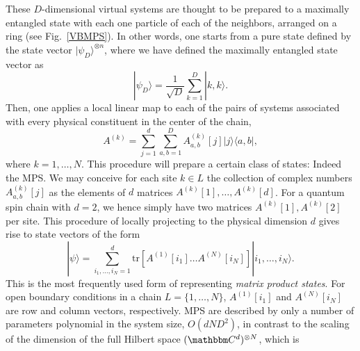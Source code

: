 \documentclass[12pt, rmp,floatfix,epsfig,graphics]{revtex4} %
\begin{document}
These $D$-dimensional virtual systems are thought to be prepared to 
a maximally entangled state with each one particle of each of the 
neighbors, arranged on a ring (see Fig.\ \ref{VBMPS}). In other words, 
one starts from a 
pure state defined by the state vector $|\psi_D\rangle ^{\otimes n}$, 
where we have defined the maximally entangled state vector as 
\begin{equation}\label{maxent}
        |\psi_D\rangle= \frac{1}{\sqrt{D}}\sum_{k=1}^D |k,k\rangle.
\end{equation}  
Then, one applies a local linear map to each of the pairs of 
systems associated with every physical constituent in the center 
of the chain,
\begin{equation}\label{project}
        A^{(k)}= \sum_{j=1}^d \sum_{a,b=1}^D A^{(k)}_{a,b}[j]
        |j\rangle\langle a,b|,
\end{equation}
where $k=1,\dots, N$. This procedure will prepare a certain 
class of states: Indeed the MPS. We may conceive
for each site $k\in L$ the collection of complex
numbers $A^{(k)}_{a,b}[j]$ as the elements of $d$ matrices
$A^{(k)}[1],\dots, A^{(k)}[d]$. For a quantum spin chain with
$d=2$, we hence simply  have two matrices $A^{(k)}[1],A^{(k)}[2]$ per site.
%
This procedure of locally projecting to the physical dimension $d$
gives rise to state vectors of the form
\begin{equation}\label{MPS}
        |\psi\rangle = \sum_{i_1,\dots, i_N=1}^d
        \text{tr}[A^{(1)}[i_1]\dots A^{(N)}[i_N] ]
        |i_1,\dots, i_N\rangle.
\end{equation}
This is the most frequently used form of representing
{\it matrix product states}. For open boundary conditions 
in a chain $L= \{1,\dots, N\}$, $ A^{(1)}[i_1]$ and $A^{(N)}[i_N] $ 
are row and column vectors, respectively. MPS are described 
by only a number of parameters polynomial in the system size, 
$O(d ND^2)$, in contrast to the scaling of the dimension of 
the full Hilbert space $(\cc^{d})^{\otimes N}$, which is 
\end{document}

